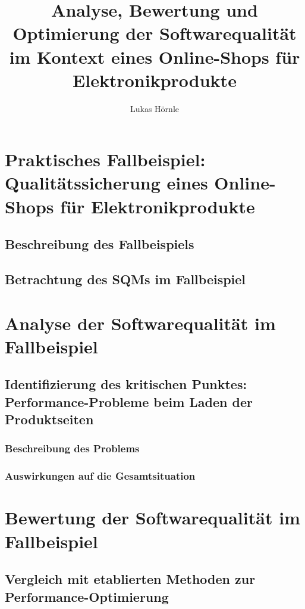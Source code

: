 \documentclass{article}
\begin{document}
\title{Analyse, Bewertung und Optimierung der Softwarequalität im Kontext eines Online-Shops für Elektronikprodukte}
\author{Lukas Hörnle}
\maketitle

\tableofcontents
\newpage




\section{Praktisches Fallbeispiel: Qualitätssicherung eines Online-Shops für Elektronikprodukte}
\subsection{Beschreibung des Fallbeispiels}
\subsection{Betrachtung des SQMs im Fallbeispiel}

\section{Analyse der Softwarequalität im Fallbeispiel}
\subsection{Identifizierung des kritischen Punktes: Performance-Probleme beim Laden der Produktseiten}
\subsubsection{Beschreibung des Problems}
\subsubsection{Auswirkungen auf die Gesamtsituation}

\section{Bewertung der Softwarequalität im Fallbeispiel}
\subsection{Vergleich mit etablierten Methoden zur Performance-Optimierung}
\end{document}
